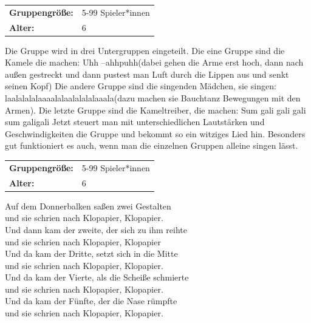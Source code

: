 \begin{table}[H]
\begin{tabular}{>{\bfseries}lp{8cm}}
   Gruppengröße:   & 5-99 Spieler*innen\\
    Alter: & 6 \\
\end{tabular}
\end{table}
    Die Gruppe wird in drei Untergruppen eingeteilt. Die eine Gruppe sind die Kamele die machen: Uhh –ahhpuhh(dabei gehen die Arme erst hoch, dann nach außen gestreckt und dann pustest man Luft durch die Lippen aus und senkt seinen Kopf) Die andere Gruppe sind die singenden Mädchen, sie singen: laalalalalaaaalalaalalalalaaala(dazu machen sie Bauchtanz Bewegungen mit den Armen). Die letzte Gruppe sind die Kameltreiber, die machen: Sum gali gali gali sum galigali Jetzt steuert man mit unterschiedlichen Lautstärken und Geschwindigkeiten die Gruppe und bekommt so ein witziges Lied hin. Besonders gut funktioniert es auch, wenn man die einzelnen Gruppen alleine singen lässt.
    \\

\begin{table}[H]
\begin{tabular}{>{\bfseries}lp{8cm}}
	Gruppengröße:   & 5-99 Spieler*innen\\
	Alter: & 6 \\
\end{tabular}
\end{table}

Auf dem Donnerbalken saßen zwei Gestalten \\
und sie schrien nach Klopapier, Klopapier. \\

Und dann kam der zweite, der sich zu ihm reihte\\
und sie schrien nach Klopapier, Klopapier\\

Und da kam der Dritte, setzt sich in die Mitte \\
und sie schrien nach Klopapier, Klopapier. \\

Und da kam der Vierte, als die Scheiße schmierte \\ 
und sie schrien nach Klopapier, Klopapier. \\

Und da kam der Fünfte, der die Nase rümpfte\\
und sie schrien nach Klopapier, Klopapier.\\

